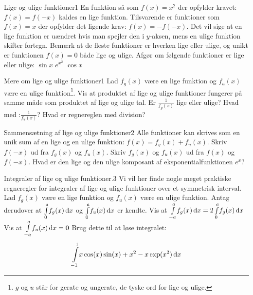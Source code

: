 \begin{opgave}{Lige og ulige funktioner}{1}
En funktion så som $f(x) = x^2$ der opfylder kravet: $f(x) = f(-x)$ kaldes en lige funktion. Tilsvarende er funktioner som $f(x) = x$ der opfylder det ligende krav: $f(x)=-f(-x)$.
Det vil sige at en lige funktion er uændret hvis man spejler den i $y$-aksen, mens en ulige funktion skifter fortegn.
Bemærk at de fleste funktioner er hverken lige eller ulige, og unikt er funktionen $f(x) = 0$ både lige og ulige.
Afgør om følgende funktioner er lige eller ulige:
\opg $\sin x$
\opg $e^{x^2}$
\opg $\cos x$
\end{opgave}

\begin{opgave}{Mere om lige og ulige funktioner}{1}
Lad $f_g(x)$ være en lige funktion og $f_u(x)$ være en ulige funktion\footnote{$g$ og $u$ står for gerate og ungerate, de tyske ord for lige og ulige.}.
\opg Vis at produktet af lige og ulige funktioner fungerer på samme måde som produktet af lige og ulige tal.
\opg Er $\frac{1}{f_{g}(x)}$ lige eller ulige?
\opg Hvad med :$\frac{1}{f_{u}(x)}$?
\opg Hvad er regnereglen med division?
\end{opgave}
\begin{opgave}{Sammensætning af lige og ulige funktioner}{2}
Alle funktioner kan skrives som en unik sum af en lige og en ulige funktion: $f(x) = f_g(x)+f_u(x)$. 
\opg Skriv $f(-x)$ ud fra $f_g(x)$ og $f_u(x)$.
\opg Skriv $f_g(x)$ og $f_u(x)$ ud fra $f(x)$ og $f(-x)$.
\opg Hvad er den lige og den ulige komposant af eksponentialfunktionen $e^x$?
\end{opgave}

\begin{opgave}{Integraler af lige og ulige funktioner.}{3}
Vi vil her finde nogle meget praktiske regneregler for integraler af lige og ulige funktioner over et symmetrisk interval.
Lad $f_g(x)$ være en lige funktion og $f_u(x)$ være en ulige funktion.
Antag derudover at $\integral{f_g(x)}{x}{0}{a}$ og $\integral{f_u(x)}{x}{0}{a}$ er kendte.
\opg Vis at $\integral{f_g(x)}{x}{-a}{a} = 2\integral{f_g(x)}{x}{0}{a}$
\opg Vis at $\integral{f_u(x)}{x}{-a}{a} = 0$
\opg Brug dette til at løse integralet: $$\integral{x\cos(x)\sin(x)+x^2-x\exp(x^2)}{x}{-1}{1}$$
\end{opgave}

